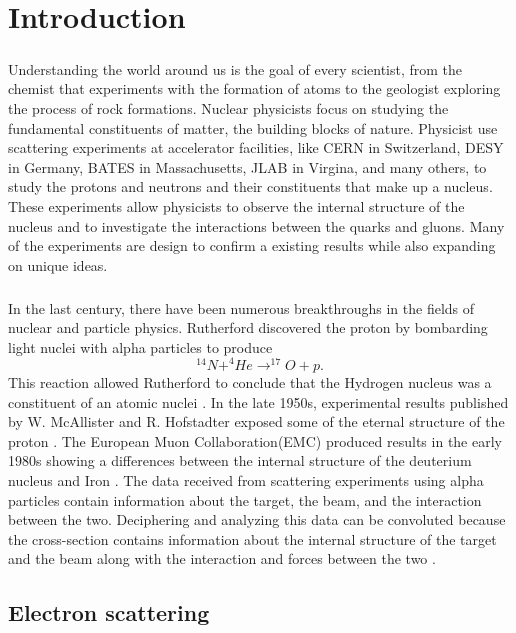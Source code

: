 


\chapter{Introduction}\paragraph{}Understanding the world around us is the goal of every scientist, from the chemist that experiments with the formation of atoms to the geologist exploring the process of rock formations. Nuclear physicists focus on studying the fundamental constituents of matter, the building blocks of nature. Physicist use scattering experiments at accelerator facilities, like CERN in Switzerland, DESY in Germany, BATES in Massachusetts, JLAB in Virgina, and many others, to study the protons and neutrons and their constituents that make up a nucleus. These experiments allow physicists to observe the internal structure of the nucleus and to investigate the interactions between the quarks and gluons. Many of the experiments are design to confirm a existing results while also expanding on unique ideas.
\paragraph{}In the last century, there have been numerous breakthroughs in the fields of nuclear and particle physics. Rutherford discovered the proton by bombarding light nuclei with alpha particles to produce 
	\begin{equation}
	^{14}N + ^4He \rightarrow ^{17}O + p.
	\end{equation}
This reaction allowed Rutherford to conclude that the Hydrogen nucleus was a constituent of an atomic nuclei \cite{PnN}. In the late 1950s, experimental results published by W. McAllister and R. Hofstadter exposed some of the eternal structure of the proton \cite{Flay,Hof}. The European Muon Collaboration(EMC) produced results in the early 1980s showing a differences between the internal structure of the deuterium nucleus and Iron \cite{seeley,CC}. The data received from scattering experiments using alpha particles contain information about the target, the beam, and the interaction between the two. Deciphering and analyzing this data can be convoluted because the cross-section contains information about the internal structure of the target and the beam along with the interaction and forces between the two \cite{PnN}.  

\section{Electron scattering}\label{sec:escat}
